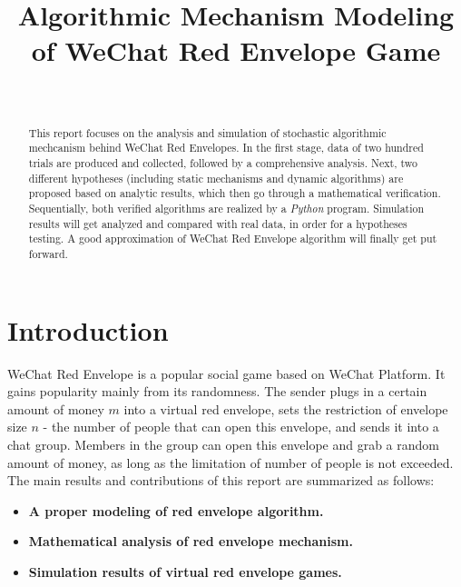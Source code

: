 \documentclass[10pt,journal]{IEEEtran}
\begin{document}
\title{Algorithmic Mechanism Modeling of WeChat Red Envelope Game}
\author{\\
} 
\maketitle

\begin{abstract}
This report focuses on the analysis and simulation of stochastic algorithmic mechcanism behind WeChat Red Envelopes. In the first stage, data of two hundred trials are produced and collected, followed by a comprehensive analysis. Next, two different hypotheses (including static mechanisms and dynamic algorithms) are proposed based on analytic results, which then go through a mathematical verification. Sequentially, both verified algorithms are realized by a \textit{Python} program. Simulation results will get analyzed and compared with real data, in order for a hypotheses testing. A good approximation of WeChat Red Envelope algorithm will finally get put forward.
\end{abstract}

\section{Introduction}
WeChat Red Envelope is a popular social game based on WeChat Platform. It gains popularity mainly from its randomness. The sender plugs in a certain amount of money $m$ into a virtual red envelope, sets the restriction of envelope size $n$ - the number of people that can open this envelope, and sends it into a chat group. Members in the group can open this envelope and grab a random amount of money, as long as the limitation of number of people is not exceeded. \\

The main results and contributions of this report are summarized as follows:
\begin{itemize}
  \item \textbf{A proper modeling of red envelope algorithm.}
  \item \textbf{Mathematical analysis of red envelope mechanism.}
  \item \textbf{Simulation results of virtual red envelope games.}
\end{itemize}
\end{document}
